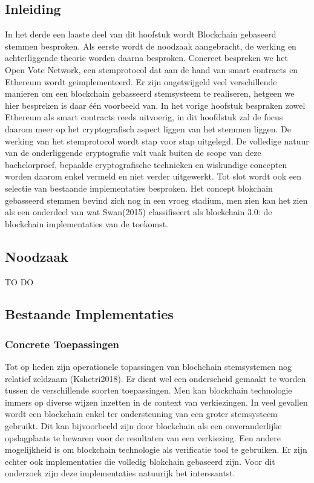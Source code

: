 	\subsection*{Inleiding}
			In het derde een laaste deel van dit hoofstuk wordt Blockchain gebaseerd stemmen besproken.  Als eerste wordt de noodzaak aangebracht, de werking en achterliggende theorie worden daarna besproken. Concreet bespreken we het Open Vote Network, een stemprotocol dat  aan de hand van smart contracts en Ethereum wordt geimplementeerd.  Er zijn ongetwijgeld veel verschillende manieren om een blockchain gebasseerd stemsysteem te realiseren,  hetgeen we hier bespreken is daar één voorbeeld van. In het vorige hoofstuk bespraken zowel Ethereum als smart contracts reeds uitvoerig, in dit hoofdstuk zal de focus daarom meer op het cryptografisch aspect liggen van het stemmen liggen. De werking van het stemprotocol wordt stap voor stap uitgelegd. De volledige natuur van de onderliggende cryptografie valt vaak buiten de scope van deze bachelorproef, bepaalde cryptografische technieken en wiskundige concepten worden daarom enkel vermeld en niet verder uitgewerkt. Tot slot wordt ook een selectie van bestaande implementaties besproken.
			Het concept blokchain gebasseerd stemmen bevind zich nog in een vroeg stadium, men zien kan het zien als een onderdeel van wat Swan(2015) classifiseert als blockchain 3.0: de blockchain implementaties van de toekomst.
	\subsection{Noodzaak}
			TO DO
	\subsection{Bestaande Implementaties}
			\subsubsection{Concrete Toepassingen}
			Tot op heden zijn operationele topassingen van blochchain stemsystemen nog relatief zeldzaam (Kshetri2018).  Er dient wel  een onderscheid gemaakt te worden tussen de verschillende soorten toepassingen. Men kan  blockchain technologie immers op diverse wijzen inzetten in de context van verkiezingen. In veel gevallen wordt een blockchain enkel ter ondersteuning van een groter stemsysteem gebruikt. Dit kan bijvoorbeeld zijn door blockchain als  een onveranderlijke opslagplaats te bewaren voor de resultaten van een verkiezing. Een andere mogelijkheid is om blockchain technologie als verificatie tool te gebruiken. Er zijn echter ook implementaties die volledig blokchain gebaseerd zijn. Voor dit onderzoek zijn deze implementaties natuurijk het interssantst.
			
